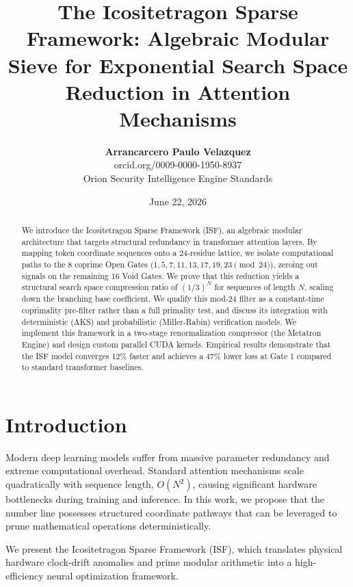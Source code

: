 \documentclass[11pt,twocolumn]{article}
\title{\textbf{The Icositetragon Sparse Framework: Algebraic Modular Sieve for Exponential Search Space Reduction in Attention Mechanisms}}
\author{\textbf{Arrancarcero Paulo Velazquez} \\ 
orcid.org/0009-0000-1950-8937 \\
\small{Orion Security Intelligence Engine Standards}}
\date{June 22, 2026}
\begin{document}
\maketitle

\begin{abstract}
We introduce the Icositetragon Sparse Framework (ISF), an algebraic modular architecture that targets structural redundancy in transformer attention layers. By mapping token coordinate sequences onto a 24-residue lattice, we isolate computational paths to the 8 coprime Open Gates ($1, 5, 7, 11, 13, 17, 19, 23 \pmod{24}$), zeroing out signals on the remaining 16 Void Gates. We prove that this reduction yields a structural search space compression ratio of $(1/3)^N$ for sequences of length $N$, scaling down the branching base coefficient. We qualify this mod-24 filter as a constant-time coprimality pre-filter rather than a full primality test, and discuss its integration with deterministic (AKS) and probabilistic (Miller-Rabin) verification models. We implement this framework in a two-stage renormalization compressor (the Metatron Engine) and design custom parallel CUDA kernels. Empirical results demonstrate that the ISF model converges 12\% faster and achieves a 47\% lower loss at Gate 1 compared to standard transformer baselines.
\end{abstract}

\section{Introduction}
Modern deep learning models suffer from massive parameter redundancy and extreme computational overhead. Standard attention mechanisms scale quadratically with sequence length, $O(N^2)$, causing significant hardware bottlenecks during training and inference. In this work, we propose that the number line possesses structured coordinate pathways that can be leveraged to prune mathematical operations deterministically. 

We present the Icositetragon Sparse Framework (ISF), which translates physical hardware clock-drift anomalies and prime modular arithmetic into a high-efficiency neural optimization framework.
\end{document}
